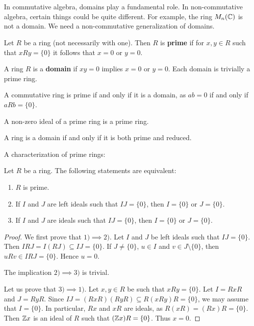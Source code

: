 \chapter{}


In commutative algebra, domains play a fundamental role. In non-commutative
algebra, certain things could be quite different. 
For example, the ring $M_n(\mathbb{C})$ is not a domain.
We need a non-commutative generalization of domains.

\begin{definition}
	Let $R$ be a ring (not necessarily with one). Then $R$ is
	\textbf{prime} if for $x,y\in R$ such that $xRy=\{0\}$ it follows that $x=0$ or 
	$y=0$.
\end{definition}

A ring $R$ is a \textbf{domain} if $xy=0$ implies
$x=0$ or $y=0$. Each domain is trivially a prime ring.

\begin{example}
    A commutative ring is prime if and only if it is a domain, as $ab=0$ 
    if and only if $aRb=\{0\}$.
\end{example}

\begin{example}
    A non-zero ideal of a prime ring is a prime ring.
\end{example}

\begin{exercise}
\label{xca:domain<=>prime+reduced}
    A ring is a domain if and only if
    it is both prime and reduced. 
\end{exercise}

A characterization of prime rings:

\begin{proposition}
    Let $R$ be a ring. The following statements are equivalent:
	\begin{enumerate}
		\item $R$ is prime.
		\item If $I$ and $J$ are left ideals such that $IJ=\{0\}$, then 
			$I=\{0\}$ or $J=\{0\}$.
		\item If $I$ and $J$ are ideals such that $IJ=\{0\}$, then $I=\{0\}$ or
			$J=\{0\}$.
	\end{enumerate}
\end{proposition}

\begin{proof}
	We first prove that $1)\implies2)$. Let $I$ and $J$ be left ideals such that
	$IJ=\{0\}$. Then $IRJ=I(RJ)\subseteq IJ=\{0\}$. If $J\ne
	\{0\}$, $u\in I$ and $v\in J\setminus\{0\}$, then $uRv\in IRJ=\{0\}$. Hence 
	$u=0$.

	The implication $2)\implies3)$ is trivial. 

    Let us prove that $3)\implies1)$. Let $x,y\in R$ be such that $xRy=\{0\}$.
	Let $I=RxR$ and $J=RyR$. Since $IJ=(RxR)(RyR)\subseteq R(xRy)R=\{0\}$, 
	we may assume that $I=\{0\}$. In particular, $Rx$ and $xR$ are ideals, as 
	$R(xR)=(Rx)R=\{0\}$. Then $\mathbb{Z} x$ is an ideal of $R$ such that $(\mathbb{Z} x)R=\{0\}$. 
	Thus $x=0$. 
\end{proof}

